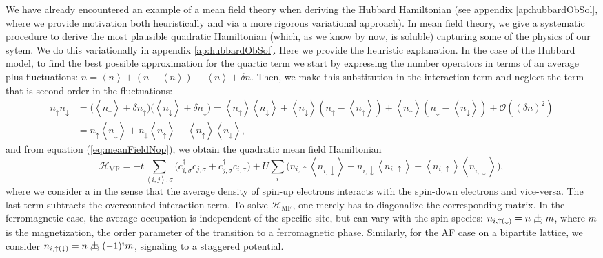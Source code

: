We have already encountered an example of a mean field theory when deriving the Hubbard Hamiltonian (see appendix \ref{ap:hubbardObSol}, where we provide motivation both heuristically and via a more rigorous variational approach).
In mean field theory, we give a systematic procedure to derive the most plausible quadratic Hamiltonian (which, as we know by now, is soluble) capturing some of the physics of our sytem.
We do this variationally in appendix \ref{ap:hubbardObSol}.
Here we provide the heuristic explanation.
In the case of the Hubbard model, to find the best possible approximation for the quartic term we start by expressing the number operators in terms of an average plus fluctuations: $n = \left\langle n \right\rangle + ( n - \left\langle n \right\rangle ) \equiv \left\langle n \right\rangle + \delta n$.
Then, we make this substitution in the interaction term and neglect the term that is second order in the fluctuations:
\begin{equation}\label{eq:meanFieldNop}
\begin{split}
n_\uparrow n_\downarrow &= \big( \left\langle n_\uparrow \right\rangle +  \delta n_\uparrow  \big) \big( \left\langle n_\downarrow \right\rangle +  \delta n_\downarrow  \big) = \left\langle n_\uparrow \right\rangle \left\langle n_\downarrow \right\rangle + \left\langle n_\downarrow \right\rangle ( n_\uparrow - \left\langle n_\uparrow \right\rangle ) + \left\langle n_\uparrow \right\rangle ( n_\downarrow - \left\langle n_\downarrow \right\rangle ) + \mathcal{O}((\delta n)^2) \\
&= n_\uparrow \left\langle n_\downarrow \right\rangle + n_\downarrow \left\langle n_\uparrow \right\rangle - \left\langle n_\uparrow \right\rangle \left\langle n_\downarrow \right\rangle ,
\end{split}
\end{equation}
and from equation (\ref{eq:meanFieldNop}), we obtain the quadratic mean field Hamiltonian
\begin{equation}
\mathcal{H}_{\text{MF}} = - t \sum_{\left\langle i, j \right\rangle, \sigma} \bigg( c_{i,\sigma}^\dagger c_{j,\sigma} + c_{j,\sigma}^\dagger c_{i,\sigma} \bigg) + U \sum_i \bigg( n_{i,\uparrow} \left\langle n_{i, \downarrow} \right\rangle + n_{i, \downarrow} \left\langle n_{i, \uparrow} \right\rangle - \left\langle n_{i, \uparrow} \right\rangle \left\langle n_{i, \downarrow} \right\rangle \bigg) ,
\end{equation}
where we consider a  in the sense that the average density of spin-up electrons interacts with the spin-down electrons and vice-versa.
The last term subtracts the overcounted  interaction term.
To solve $\mathcal{H}_{\text{MF}}$, one merely has to diagonalize the corresponding matrix.
In the ferromagnetic case, the average occupation is independent of the specific site, but can vary with the spin species: $n_{i, \uparrow(\downarrow)} = n \Pm m$, where $m$ is the magnetization, the order parameter of the transition to a ferromagnetic phase.
Similarly, for the \acs{AF} case on a bipartite lattice, we consider $n_{i, \uparrow(\downarrow)} = n \Pm (-1)^{i} m$, signaling to a staggered potential.

